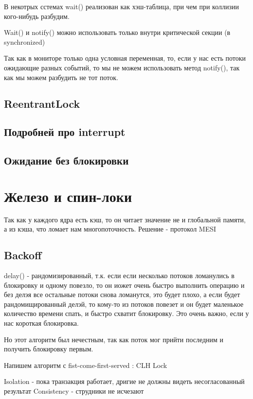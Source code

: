 \documentclass[10pt,a4paper,oneside,titlepage]{article}
\theoremstyle{plain}
\theoremstyle{defenition}
\begin{document}
В некотрых сстемах wait() реализован как хэш-таблица, при чем при коллизии кого-нибудь разбудим.

Wait() и notify() можно использовать только внутри критической секции (в synchronized)

Так как в мониторе только одна условная переменная, то, если у нас есть потоки ожидающие разных событий, то мы не можем использовать метод notify(), так как мы можем разбудить не тот поток.

\subsection{ReentrantLock}

\subsection{Подробней про interrupt}

\subsection{Ожидание без блокировки}

\section{Железо и спин-локи}
Так как у каждого ядра есть кэш, то он читает значение не и глобальной памяти, а из кэша, что ломает нам многопоточность. Решение - протокол MESI

\subsection{Backoff}
delay() - рандомизированный, т.к. если если несколько потоков ломанулись в блокировку и одному повезло, то он иожет очень быстро выполнить операцию и без делэя все остальные потоки снова ломанутся, это будет плохо, а если будет рандомищированный делэй, то кому-то из потоков повезет и он будет маленькое количество времени спать, и быстро схватит блокировку. Это очень важно, если у нас короткая блокировка.

Но этот алгоритм был нечестным, так как поток мог прийти последним и получить блокировку первым.

Напишем алгоритм с fist-come-first-served : CLH Lock

Isolation - пока транзакция работает, дригие не должны видеть несогласованный результат
Consistency - струдники не исчезают
\end{document}

